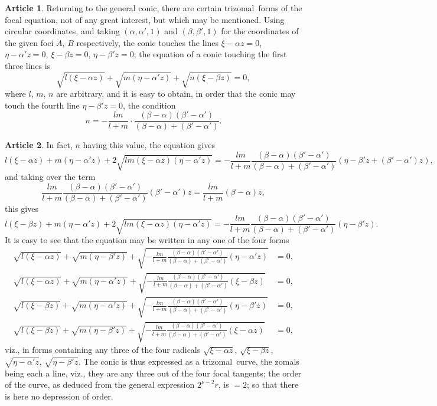 \documentclass[11pt,a4paper]{article}
\theoremstyle{definition}
\newtheorem{art}{Article}
\newcommand{\trizomal}{trizomal}
\begin{document}
\begin{art}
Returning to the general conic, there are certain \trizomal\ forms of the focal equation, not of any great interest, but which may be mentioned. Using circular coordinates, and taking $(\alpha, \alpha', 1)$ and $(\beta, \beta', 1)$ for the coordinates of the given foci $A$, $B$ respectively, the conic touches the lines $\xi - \alpha z = 0$, $\eta - \alpha' z = 0$, $\xi - \beta z = 0$, $\eta - \beta' z = 0$; the equation of a conic touching the first three lines is
\[
\sqrt{l(\xi - \alpha z)} + \sqrt{m(\eta - \alpha' z)} + \sqrt{n(\xi - \beta z)} = 0,
\]
where $l$, $m$, $n$ are arbitrary, and it is easy to obtain, in order that the conic may touch the fourth line $\eta - \beta' z = 0$, the condition
\[
n = -\frac{lm}{l + m} \cdot \frac{(\beta - \alpha)(\beta' - \alpha')}{(\beta - \alpha) + (\beta' - \alpha')}.
\]
\end{art}

\begin{art}
In fact, $n$ having this value, the equation gives
\[
l(\xi - \alpha z) + m(\eta - \alpha' z) + 2\sqrt{lm(\xi - \alpha z)(\eta - \alpha' z)} = -\frac{lm}{l + m}\frac{(\beta - \alpha)(\beta' - \alpha')}{(\beta - \alpha) + (\beta' - \alpha')}(\eta - \beta' z + (\beta' - \alpha')z),
\]
and taking over the term
\[
\frac{lm}{l + m}\frac{(\beta - \alpha)(\beta' - \alpha')}{(\beta - \alpha) + (\beta' - \alpha')}(\beta' - \alpha')z = \frac{lm}{l + m}(\beta - \alpha)z,
\]
this gives
\[
l(\xi - \beta z) + m(\eta - \alpha' z) + 2\sqrt{lm(\xi - \alpha z)(\eta - \alpha' z)} = -\frac{lm}{l + m}\frac{(\beta - \alpha)(\beta' - \alpha')}{(\beta - \alpha) + (\beta' - \alpha')}(\eta - \beta' z).
\]
It is easy to see that the equation may be written in any one of the four forms
\begin{align*}
\sqrt{l(\xi - \alpha z)} + \sqrt{m(\eta - \beta' z)} + \sqrt{-\tfrac{lm}{l+m}\tfrac{(\beta-\alpha)(\beta'-\alpha')}{(\beta-\alpha)+(\beta'-\alpha')}(\eta - \alpha' z)} &= 0, \\
\sqrt{l(\xi - \alpha z)} + \sqrt{m(\eta - \alpha' z)} + \sqrt{-\tfrac{lm}{l+m}\tfrac{(\beta-\alpha)(\beta'-\alpha')}{(\beta-\alpha)+(\beta'-\alpha')}(\xi - \beta z)} &= 0, \\
\sqrt{l(\xi - \beta z)} + \sqrt{m(\eta - \alpha' z)} + \sqrt{-\tfrac{lm}{l+m}\tfrac{(\beta-\alpha)(\beta'-\alpha')}{(\beta-\alpha)+(\beta'-\alpha')}(\eta - \beta' z)} &= 0, \\
\sqrt{l(\xi - \beta z)} + \sqrt{m(\eta - \beta' z)} + \sqrt{-\tfrac{lm}{l+m}\tfrac{(\beta-\alpha)(\beta'-\alpha')}{(\beta-\alpha)+(\beta'-\alpha')}(\xi - \alpha z)} &= 0,
\end{align*}
viz., in forms containing any three of the four radicals $\sqrt{\xi - \alpha z}$, $\sqrt{\xi - \beta z}$, $\sqrt{\eta - \alpha' z}$, $\sqrt{\eta - \beta' z}$. The conic is thus expressed as a \trizomal\ curve, the zomals being each a line, viz., they are any three out of the four focal tangents; the order of the curve, as deduced from the general expression $2^{\nu-2}r$, is $= 2$; so that there is here no depression of order.
\end{art}
\end{document}
